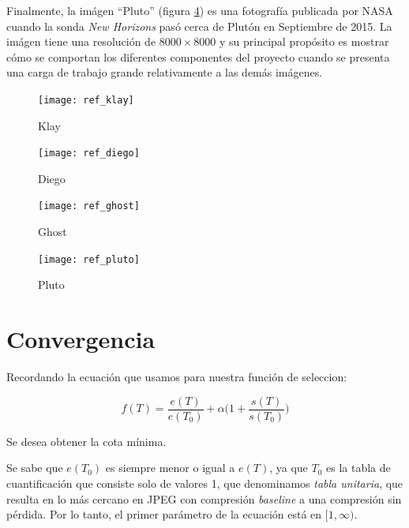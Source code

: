 Finalmente, la imágen ``Pluto'' (figura \ref{fig:ref-pluto}) es una fotografía
publicada por NASA cuando la sonda \emph{New Horizons} pasó cerca de Plutón en
Septiembre de 2015. La imágen tiene una resolución de $8000\times8000$ y su
principal propósito es mostrar cómo se comportan los diferentes componentes del
proyecto cuando se presenta una carga de trabajo grande relativamente a las
demás imágenes.

\begin{figure}[b]
    \texttt{[image: ref\_klay]}
    \caption{Klay}
    \label{fig:ref-klay}
\end{figure}

\begin{figure}[b]
    \texttt{[image: ref\_diego]}
    \caption{Diego}
    \label{fig:ref-diego}
\end{figure}

\begin{figure}[b]
    \texttt{[image: ref\_ghost]}
    \caption{Ghost}
    \label{fig:ref-ghost}
\end{figure}

\begin{figure}[b]
    \texttt{[image: ref\_pluto]}
    \caption{Pluto}
    \label{fig:ref-pluto}
\end{figure}


\section{Convergencia}

Recordando la ecuación que usamos para nuestra función de seleccion:

\begin{equation}
f(T) = \frac{e(T)}{e(T_0)} + \alpha \Big(1 + \frac{s(T)}{s(T_0)}\Big)
\end{equation}\label{eq:fitness-repeated}

Se desea obtener la cota mínima.

Se sabe que $e(T_0)$ es siempre menor o igual a $e(T)$, ya que $T_0$ es la
tabla de cuantificación que consiste solo de valores 1, que denominamos
\emph{tabla unitaria}, que resulta en lo más cercano en JPEG con compresión
\emph{baseline} a una compresión sin pérdida. Por lo tanto, el primer parámetro
de la ecuación está en $[1, \infty)$.

